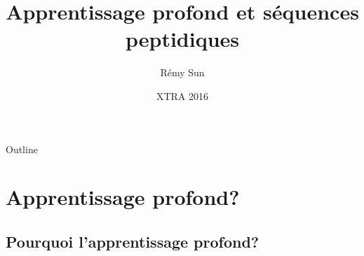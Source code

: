 \documentclass{beamer}
\title[Short Paper Title] %
{Apprentissage profond et séquences peptidiques}
\author{Rémy Sun} %
\institute[ENS Rennes] %
{
  Département d'informatique\\
  ENS Rennes
}
\date[XTRA 2016] %
{XTRA 2016}
\begin{document}
\begin{frame}
  \titlepage
\end{frame}

\begin{frame}{Outline}
  \tableofcontents[pausesections]
\end{frame}





\section{Apprentissage profond?}

\subsection{Pourquoi l'apprentissage profond?}
\end{document}
